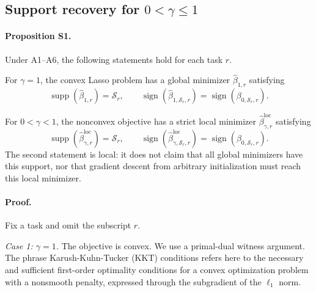\documentclass{article}
\begin{document}
\subsection{Support recovery for \(0<\gamma\le1\)}

\paragraph{Proposition S1.}
Under A1--A6, the following statements hold for each task \(r\).

For \(\gamma=1\), the convex Lasso problem has a global minimizer \(\widehat\beta_{1,r}\) satisfying
\begin{equation}
\operatorname{supp}(\widehat\beta_{1,r})=\mathcal S_r,
\qquad
\operatorname{sign}(\widehat\beta_{1,\mathcal S_r,r})=
\operatorname{sign}(\beta_{0,\mathcal S_r,r}).
\end{equation}

For \(0<\gamma<1\), the nonconvex objective has a strict local minimizer \(\widehat\beta_{\gamma,r}^{\mathrm{loc}}\) satisfying
\begin{equation}
\operatorname{supp}(\widehat\beta_{\gamma,r}^{\mathrm{loc}})=\mathcal S_r,
\qquad
\operatorname{sign}(\widehat\beta_{\gamma,\mathcal S_r,r}^{\mathrm{loc}})=
\operatorname{sign}(\beta_{0,\mathcal S_r,r}).
\end{equation}
The second statement is local: it does not claim that all global minimizers have this support, nor that gradient descent from arbitrary initialization must reach this local minimizer.

\paragraph{Proof.}
Fix a task and omit the subscript \(r\).

\emph{Case 1: \(\gamma=1\).}
The objective is convex. We use a primal-dual witness argument. The phrase Karush-Kuhn-Tucker (KKT) conditions refers here to the necessary and sufficient first-order optimality conditions for a convex optimization problem with a nonsmooth penalty, expressed through the subgradient of the \(\ell_1\) norm.
\end{document}
